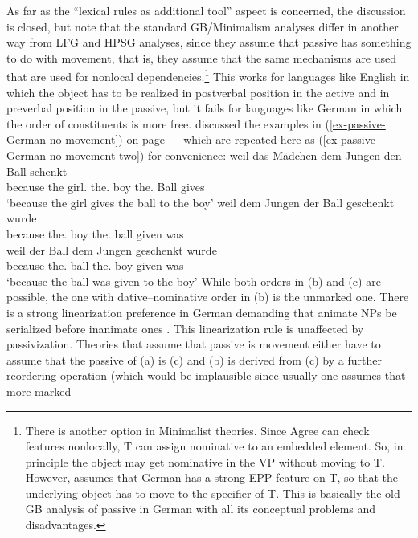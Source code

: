 As far as the ``lexical rules as additional tool'' aspect is concerned, the discussion is closed, but
note that the standard GB/Minimalism analyses differ in another way from LFG and HPSG analyses,
since they assume that passive has something to do with movement, that is, they assume that the same mechanisms
are used that are used for nonlocal dependencies.\footnote{%
  There is another option in Minimalist theories. Since Agree can check features
  nonlocally, T can assign nominative to an embedded element. So, in principle the object may get
  nominative in the VP without moving to T. However, \citet[]{Adger2003a} assumes that German has a
  strong EPP feature on T, so that the underlying object has to move to the specifier of T. This is
  basically the old GB analysis of passive in German with all its conceptual problems and disadvantages.
}
This works for languages like English in which
the object has to be realized in postverbal position in the active and in preverbal position in the
passive, but it fails for languages like German in which the order of constituents is more free.
\citet[Section~4.4.3]{Lenerz77} discussed the examples in (\ref{ex-passive-German-no-movement}) on
page~\pageref{ex-passive-German-no-movement} -- which are repeated here as
(\ref{ex-passive-German-no-movement-two}) for convenience:
\eal
\label{ex-passive-German-no-movement-two}
\ex 
\gll weil das Mädchen        dem Jungen     den Ball schenkt\\
     because the girl.\nom{} the.\dat{} boy the.\acc{} Ball gives\\
\glt `because the girl gives the ball to the boy'
\ex 
\gll weil dem Jungen der Ball geschenkt wurde\\
     because the.\dat{} boy the.\nom{} ball given was\\
\ex 
\gll weil der Ball dem Jungen geschenkt wurde\\
     because the.\nom{} ball the.\dat{} boy given was\\
\glt `because the ball was given to the boy'
\zl
While both orders in (b) and (c) are possible, the one with dative--nominative order
in (b) is the unmarked one. There is a strong linearization preference in German demanding that
animate NPs be serialized before inanimate ones \citep[]{Hoberg81a}. This linearization rule is
unaffected by passivization. 
Theories that assume that passive is movement either have to
assume that the passive of (a) is (c) and (b) is derived from (c) by a
further reordering operation (which would be implausible since usually one assumes that more marked
